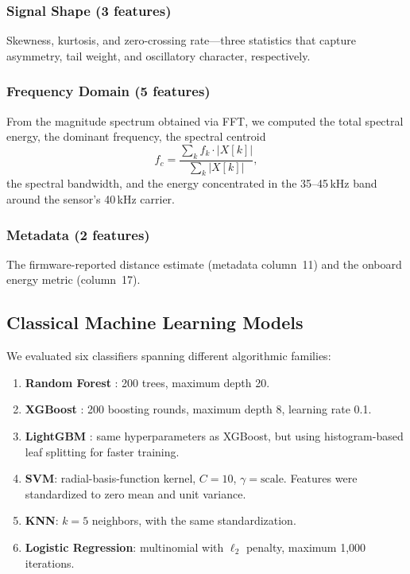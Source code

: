 \documentclass[conference,a4paper]{IEEEtran}
\begin{document}
\subsubsection{Signal Shape (3 features)}
Skewness, kurtosis, and zero-crossing rate---three statistics that capture asymmetry, tail weight, and oscillatory character, respectively.

\subsubsection{Frequency Domain (5 features)}
From the magnitude spectrum obtained via FFT, we computed the total spectral energy, the dominant frequency, the spectral centroid
\begin{equation}
    f_c = \frac{\sum_{k} f_k \cdot |X[k]|}{\sum_{k} |X[k]|},
    \label{eq:centroid}
\end{equation}
the spectral bandwidth, and the energy concentrated in the 35--45\,kHz band around the sensor's 40\,kHz carrier.

\subsubsection{Metadata (2 features)}
The firmware-reported distance estimate (metadata column~11) and the onboard energy metric (column~17).

\subsection{Classical Machine Learning Models}

We evaluated six classifiers spanning different algorithmic families:

\begin{enumerate}
    \item \textbf{Random Forest} \cite{breiman2001}: 200 trees, maximum depth 20.
    \item \textbf{XGBoost} \cite{chen2016}: 200 boosting rounds, maximum depth 8, learning rate 0.1.
    \item \textbf{LightGBM} \cite{ke2017}: same hyperparameters as XGBoost, but using histogram-based leaf splitting for faster training.
    \item \textbf{SVM}: radial-basis-function kernel, $C=10$, $\gamma=\text{scale}$. Features were standardized to zero mean and unit variance.
    \item \textbf{KNN}: $k=5$ neighbors, with the same standardization.
    \item \textbf{Logistic Regression}: multinomial with $\ell_2$ penalty, maximum 1{,}000 iterations.
\end{enumerate}
\end{document}
